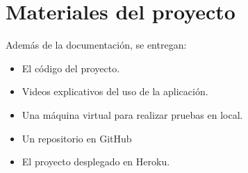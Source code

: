 \section{Materiales del proyecto}
Además de la documentación, se entregan:
\begin{itemize}
    \item El código del proyecto.
    \item Videos explicativos del uso de la aplicación.
    \item Una máquina virtual para realizar pruebas en local.
    \item Un repositorio en GitHub
    \item El proyecto desplegado en Heroku.
\end{itemize}





